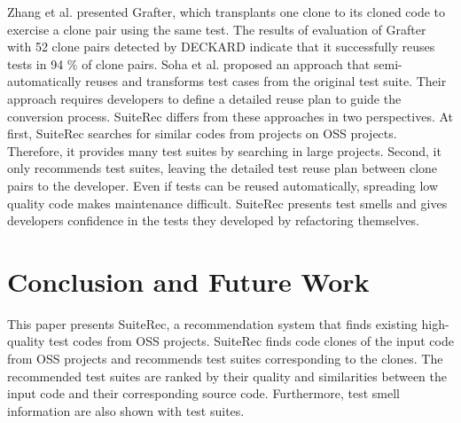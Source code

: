 \documentclass[conference]{IEEEtran}
\begin{document}
Zhang et al. \cite{Zhang:2017} presented Grafter, which transplants one clone to its cloned code to exercise a clone pair using the same test. The results of evaluation of Grafter with 52 clone pairs detected by DECKARD \cite{Jiang:2007} indicate that it successfully reuses tests in 94 \% of clone pairs. Soha et al.\cite{soha:2013} proposed an approach that semi-automatically reuses and transforms test cases from the original test suite. Their approach requires developers to define a detailed reuse plan to guide the conversion process. \textsf{SuiteRec} differs from these approaches in two perspectives. At first, \textsf{SuiteRec} searches for similar codes from projects on OSS projects. Therefore, it provides many test suites by searching in large projects. Second, it only recommends test suites, leaving the detailed test reuse plan between clone pairs to the developer. Even if tests can be reused automatically, spreading low quality code makes maintenance difficult. \textsf{SuiteRec} presents test smells and gives developers confidence in the tests they developed by refactoring themselves.



\section{Conclusion and Future Work}
\label{sec:conc}
This paper presents \textsf{SuiteRec}, a recommendation system that finds existing high-quality test codes from OSS projects. \textsf{SuiteRec} finds code clones of the input code from OSS projects and recommends test suites corresponding to the clones. The recommended test suites are ranked by their quality and similarities between the input code and their corresponding source code. Furthermore, test smell information are also shown with test suites.
\end{document}
